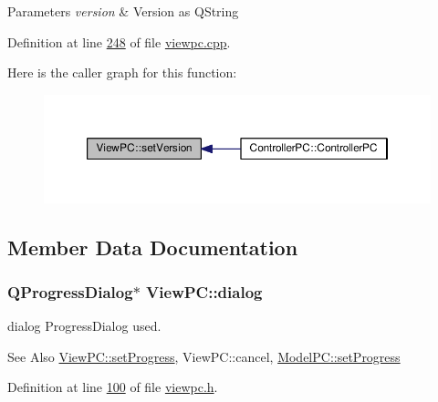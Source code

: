 \begin{DoxyParams}{Parameters}
{\em version} & Version as Q\-String \\
\hline
\end{DoxyParams}


Definition at line \hyperlink{viewpc_8cpp_source_l00248}{248} of file \hyperlink{viewpc_8cpp_source}{viewpc.\-cpp}.



Here is the caller graph for this function\-:
\nopagebreak
\begin{figure}[H]
\begin{center}
\leavevmode
\includegraphics[width=350pt]{class_view_p_c_ac05220df875b7c4f24405a5742476ebf_icgraph}
\end{center}
\end{figure}




\subsection{Member Data Documentation}
\hypertarget{class_view_p_c_a31abbb470fe329b44e6ffee202b903ca}{
\subsubsection[{dialog}]{\setlength{\rightskip}{0pt plus 5cm}Q\-Progress\-Dialog$\ast$ View\-P\-C\-::dialog}}\label{class_view_p_c_a31abbb470fe329b44e6ffee202b903ca}


dialog Progress\-Dialog used. 

\begin{DoxySeeAlso}{See Also}
\hyperlink{class_view_p_c_a9c32a1fdb6ead84e5ada8fba8860c7ed}{View\-P\-C\-::set\-Progress}, View\-P\-C\-::cancel, \hyperlink{class_model_p_c_afdcd80f0ed5062e145a71f09b0897547}{Model\-P\-C\-::set\-Progress} 
\end{DoxySeeAlso}


Definition at line \hyperlink{viewpc_8h_source_l00100}{100} of file \hyperlink{viewpc_8h_source}{viewpc.\-h}.

